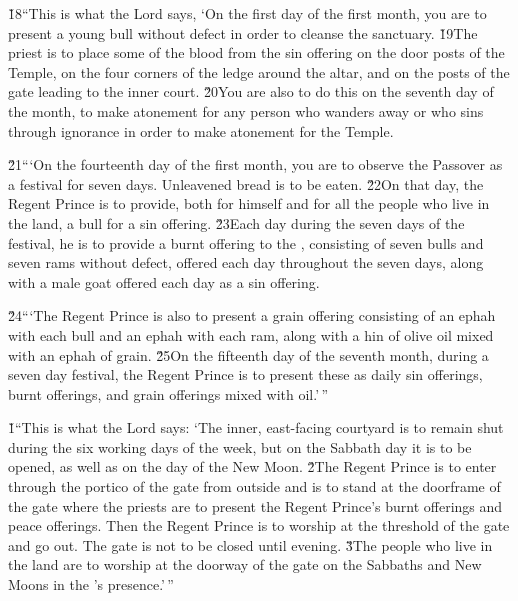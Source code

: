 \v{18}``This is what the Lord  says, `On the first day of the first month, you are to present a young bull without defect in order to cleanse the sanctuary. \v{19}The priest is to place some of the blood from the sin offering on the door posts of the Temple, on the four corners of the ledge around the altar, and on the posts of the gate leading to the inner court. \v{20}You are also to do this on the seventh day of the month, to make atonement for any person who wanders away or who sins through ignorance in order to make atonement for the Temple.

\v{21}```On the fourteenth day of the first month, you are to observe the Passover as a festival for seven days. Unleavened bread is to be eaten. \v{22}On that day, the Regent Prince is to provide, both for himself and for all the people who live in the land, a bull for a sin offering. \v{23}Each day during the seven days of the festival, he is to provide a burnt offering to the , consisting of seven bulls and seven rams without defect, offered each day throughout the seven days, along with a male goat offered each day as a sin offering.

\v{24}```The Regent Prince is also to present a grain offering consisting of an ephah with each bull and an ephah with each ram, along with a hin of olive oil mixed with an ephah of grain. \v{25}On the fifteenth day of the seventh month, during a seven day festival, the Regent Prince is to present these as daily sin offerings, burnt offerings, and grain offerings mixed with oil.'\,''

\v{1}``This is what the Lord  says: `The inner, east-facing courtyard is to remain shut during the six working days of the week, but on the Sabbath day it is to be opened, as well as on the day of the New Moon. \v{2}The Regent Prince is to enter through the portico of the gate from outside and is to stand at the doorframe of the gate where the priests are to present the Regent Prince's burnt offerings and peace offerings. Then the Regent Prince is to worship at the threshold of the gate and go out. The gate is not to be closed until evening. \v{3}The people who live in the land are to worship at the doorway of the gate on the Sabbaths and New Moons in the 's presence.'\,''

